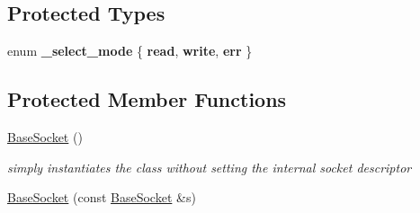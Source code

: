 \subsection*{Protected Types}
\begin{CompactItemize}
\item 
enum \textbf{\_\-select\_\-mode} \{ \textbf{read}, 
\textbf{write}, 
\textbf{err}
 \}
\subsection*{Protected Member Functions}
\begin{CompactItemize}
\item 
\hypertarget{classsocketpp_1_1BaseSocket_3eb81ecbf94ce83afa6b2f60206c77f2}{
\hyperlink{classsocketpp_1_1BaseSocket_3eb81ecbf94ce83afa6b2f60206c77f2}{BaseSocket} ()}
\label{classsocketpp_1_1BaseSocket_3eb81ecbf94ce83afa6b2f60206c77f2}

\begin{CompactList}\small\item\em simply instantiates the class without setting the internal socket descriptor \item\end{CompactList}\item 
\hypertarget{classsocketpp_1_1BaseSocket_0c142db99422572579c91f3e176035c6}{
\hyperlink{classsocketpp_1_1BaseSocket_0c142db99422572579c91f3e176035c6}{BaseSocket} (const \hyperlink{classsocketpp_1_1BaseSocket}{BaseSocket} \&s)}
\label{classsocketpp_1_1BaseSocket_0c142db99422572579c91f3e176035c6}


\end{CompactItemize}
\end{CompactItemize}
